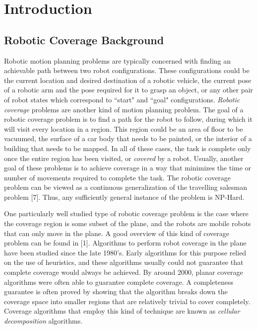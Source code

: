 \chapter{Introduction}

\section{Robotic Coverage Background}

Robotic motion planning problems are typically concerned with finding an achievable path between two robot configurations. These configurations could be the current location and desired destination of a robotic vehicle, the current pose of a robotic arm and the pose required for it to grasp an object, or any other pair of robot states which correspond to ``start" and ``goal" configurations. \textit{Robotic coverage} problems are another kind of motion planning problem. The goal of a robotic coverage problem is to find a path for the robot to follow, during which it will visit every location in a region. This region could be an area of floor to be vacuumed, the surface of a car body that needs to be painted, or the interior of a building that needs to be mapped. In all of these cases, the task is complete only once the entire region has been visited, or \textit{covered} by a robot. Usually, another goal of these problems is to achieve coverage in a way that minimizes the time or number of movements required to complete the task.
The robotic coverage problem can be viewed as a continuous generalization of the travelling salesman problem [7]. Thus, any sufficiently general instance of the problem is NP-Hard. 

One particularly well studied type of robotic coverage problem is the case where the coverage region is some subset of the plane, and the robots are mobile robots that can only move in the plane. A good overview of this kind of coverage problem can be found in [1]. Algorithms to perform robot coverage in the plane have been studied since the late 1980's. Early algorithms for this purpose relied on the use of heuristics, and these algorithms usually could not guarantee that complete coverage would always be achieved. By around 2000, planar coverage algorithms were often able to guarantee complete coverage. A completeness guarantee is often proved by showing that the algorithm breaks down the coverage space into smaller regions that are relatively trivial to cover completely. Coverage algorithms that employ this kind of technique are known as \textit{cellular decomposition} algorithms.

